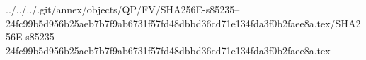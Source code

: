 ../../../.git/annex/objects/QP/FV/SHA256E-s85235--24fc99b5d956b25aeb7b7f9ab6731f57fd48dbbd36cd71e134fda3f0b2faee8a.tex/SHA256E-s85235--24fc99b5d956b25aeb7b7f9ab6731f57fd48dbbd36cd71e134fda3f0b2faee8a.tex